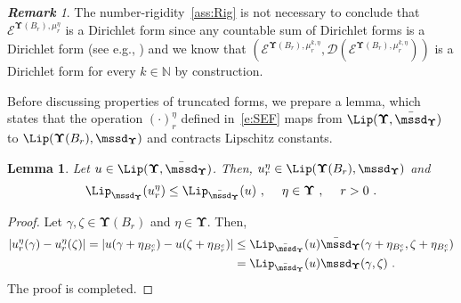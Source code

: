 \documentclass[11pt,letterpaper]{amsart}
\newcommand{\dom}[1]{\mathcal D(#1)}
\newcommand{\N}{{\mathbb N}}
\newcommand{\comma}{\,\,\mathrm{,}\;\,}
\newcommand{\fstop}{\,\,\mathrm{.}}
\newcommand{\dUpsilon}{{\mathbf \Upsilon}}
\newcommand{\U}{\dUpsilon}
\newcommand{\E}{\mathcal E}
\renewcommand{\1}{\mathbf 1}
\numberwithin{equation}{section}
\theoremstyle{plain}
\newtheorem{lem}[thm]{Lemma}%
\theoremstyle{definition}
\theoremstyle{remark}
\newtheorem{rem}[thm]{\bf Remark}%
\begin{document}
\begin{rem}\label{r:NRI}
The number-rigidity~\ref{ass:Rig} is not necessary to conclude that $\E^{\U(B_r), \mu_r^\eta}$ is a Dirichlet form since
any countable sum of Dirichlet forms is a Dirichlet form (see e.g., \cite[Exercise~3.9 in p.31]{MaRoe90}) and we know that $(\E^{\U(B_r), \mu_r^{k, \eta}}, \dom{\E^{\U(B_r), \mu_r^{k, \eta}}})$ is a Dirichlet form for every $k \in \N$ by construction. 
\end{rem}

Before discussing properties of truncated forms, we prepare a lemma, which states that the operation $(\cdot)_r^\eta$ defined in~\eqref{e:SEF} maps from $\Lip(\U, \bar{\mssd}_\U)$ to $\Lip(\U(B_r), \mssd_\U)$ and contracts Lipschitz constants. 
\begin{lem}\label{l:SEF3}
Let $u \in \Lip(\U, \bar{\mssd}_\U)$. Then, $u_r^\eta \in \Lip(\U(B_r), \mssd_\U)$ and 
\begin{align} \label{e:SEF3}
\Lip_{\mssd_\U}(u_r^\eta) \le \Lip_{\bar{\mssd}_\U}(u) \comma \quad \eta \in \U\comma \quad r>0\fstop
\end{align}
\end{lem}
\begin{proof}
Let $\gamma, \zeta \in \U(B_r)$ and $\eta \in \U$. Then, 
\begin{align*}
|u_{r}^\eta(\gamma)-u_{r}^\eta(\zeta)|=|u(\gamma+\eta_{B_r^c})-u(\zeta+\eta_{B_r^c})| &\le \Lip_{\bar{\mssd}_\U}(u) \bar{\mssd}_\U(\gamma+\eta_{B_r^c}, \zeta+\eta_{B_r^c}) 
\\
&= \Lip_{\bar{\mssd}_\U}(u) \mssd_\U(\gamma, \zeta) \fstop
\end{align*}
The proof is completed. 
\end{proof}
\end{document}
